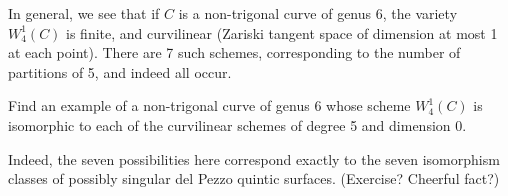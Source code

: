 In general, we see that if $C$ is a non-trigonal curve of genus 6, the variety $W^1_4(C)$ is finite, and curvilinear (Zariski tangent space of dimension at most 1 at each point). There are 7 such schemes, corresponding to the number of partitions of 5, and indeed all occur.

\begin{exercise}
Find an example of a non-trigonal curve of genus 6 whose scheme $W^1_4(C)$ is isomorphic to each of the curvilinear schemes of degree 5 and dimension 0.
\end{exercise}

Indeed, the seven possibilities here correspond exactly to the seven isomorphism classes of possibly singular del Pezzo quintic surfaces. (Exercise? Cheerful fact?)




